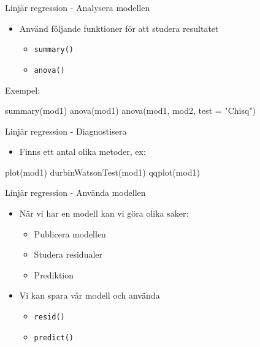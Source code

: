\documentclass[
  11pt,
  ignorenonframetext,
  handout]{beamer}
\newenvironment{Shaded}{\begin{snugshade}}{\end{snugshade}}
\newcommand{\AttributeTok}[1]{\textcolor[rgb]{0.77,0.63,0.00}{#1}}
\newcommand{\FunctionTok}[1]{\textcolor[rgb]{0.00,0.00,0.00}{#1}}
\newcommand{\NormalTok}[1]{#1}
\newcommand{\StringTok}[1]{\textcolor[rgb]{0.31,0.60,0.02}{#1}}
\providecommand{\tightlist}{%
  \setlength{\itemsep}{0pt}\setlength{\parskip}{0pt}}
\begin{document}
\begin{frame}[fragile]{Linjär regression - Analysera modellen}
\protect\hypertarget{linjuxe4r-regression---analysera-modellen}{}
\begin{itemize}
\tightlist
\item
  Använd följande funktioner för att studera resultatet

  \begin{itemize}
  \tightlist
  \item
    \texttt{summary()}
  \item
    \texttt{anova()}
  \end{itemize}
\end{itemize}

Exempel:

\begin{Shaded}
\begin{Highlighting}[]
\FunctionTok{summary}\NormalTok{(mod1)}
\FunctionTok{anova}\NormalTok{(mod1)}
\FunctionTok{anova}\NormalTok{(mod1, mod2, }\AttributeTok{test =} \StringTok{"Chisq"}\NormalTok{)}
\end{Highlighting}
\end{Shaded}
\end{frame}

\begin{frame}[fragile]{Linjär regression - Diagnostisera}
\protect\hypertarget{linjuxe4r-regression---diagnostisera}{}
\begin{itemize}
\tightlist
\item
  Finns ett antal olika metoder, ex:
\end{itemize}

\begin{Shaded}
\begin{Highlighting}[]
\FunctionTok{plot}\NormalTok{(mod1)}
\FunctionTok{durbinWatsonTest}\NormalTok{(mod1)}
\FunctionTok{qqplot}\NormalTok{(mod1)}
\end{Highlighting}
\end{Shaded}
\end{frame}

\begin{frame}{Linjär regression - Använda modellen}
\protect\hypertarget{linjuxe4r-regression---anvuxe4nda-modellen}{}
\begin{itemize}
\tightlist
\item
  När vi har en modell kan vi göra olika saker:

  \begin{itemize}
  \tightlist
  \item
    Publicera modellen
  \item
    Studera residualer
  \item
    Prediktion
  \end{itemize}
\item
  Vi kan spara vår modell och använda

  \begin{itemize}
  \tightlist
  \item
    \texttt{resid()}
  \item
    \texttt{predict()}
  \end{itemize}
\end{itemize}
\end{frame}
\end{document}
